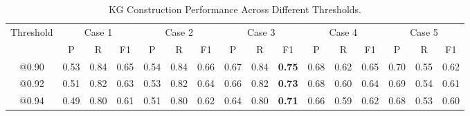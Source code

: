 \begin{table*}[t]
\centering
\caption{KG Construction Performance Across Different Thresholds.}
\label{tab: res12}
\begin{tabular}{c|ccc|ccc|ccc|ccl|lll}
\hline
\multirow{2}{*}{Threshold} & \multicolumn{3}{c|}{Case 1}                                  & \multicolumn{3}{c|}{Case 2}                                  & \multicolumn{3}{c|}{Case 3}                                           & \multicolumn{3}{c|}{Case 4}                                                     & \multicolumn{3}{c}{Case 5}                                                     \\ \cline{2-16} 
                           & \multicolumn{1}{c|}{P}    & \multicolumn{1}{c|}{R}    & F1   & \multicolumn{1}{c|}{P}    & \multicolumn{1}{c|}{R}    & F1   & \multicolumn{1}{c|}{P}    & \multicolumn{1}{c|}{R}    & F1            & \multicolumn{1}{c|}{P}    & \multicolumn{1}{c|}{R}    & \multicolumn{1}{c|}{F1} & \multicolumn{1}{c|}{P}    & \multicolumn{1}{c|}{R}    & \multicolumn{1}{c}{F1} \\ \hline
@0.90                      & \multicolumn{1}{c|}{0.53} & \multicolumn{1}{c|}{0.84} & 0.65 & \multicolumn{1}{c|}{0.54} & \multicolumn{1}{c|}{0.84} & 0.66 & \multicolumn{1}{c|}{0.67} & \multicolumn{1}{c|}{0.84} & \textbf{0.75} & \multicolumn{1}{c|}{0.68} & \multicolumn{1}{c|}{0.62} & 0.65                    & \multicolumn{1}{l|}{0.70} & \multicolumn{1}{l|}{0.55} & 0.62                   \\ \hline
@0.92                      & \multicolumn{1}{c|}{0.51} & \multicolumn{1}{c|}{0.82} & 0.63 & \multicolumn{1}{c|}{0.53} & \multicolumn{1}{c|}{0.82} & 0.64 & \multicolumn{1}{c|}{0.66} & \multicolumn{1}{c|}{0.82} & \textbf{0.73} & \multicolumn{1}{c|}{0.68} & \multicolumn{1}{c|}{0.60} & 0.64                    & \multicolumn{1}{l|}{0.69} & \multicolumn{1}{l|}{0.54} & 0.61                   \\ \hline
@0.94                      & \multicolumn{1}{c|}{0.49} & \multicolumn{1}{c|}{0.80} & 0.61 & \multicolumn{1}{c|}{0.51} & \multicolumn{1}{c|}{0.80} & 0.62 & \multicolumn{1}{c|}{0.64} & \multicolumn{1}{c|}{0.80} & \textbf{0.71} & \multicolumn{1}{c|}{0.66} & \multicolumn{1}{c|}{0.59} & 0.62                    & \multicolumn{1}{l|}{0.68} & \multicolumn{1}{l|}{0.53} & 0.60                   \\ \hline
\end{tabular}
\end{table*}

